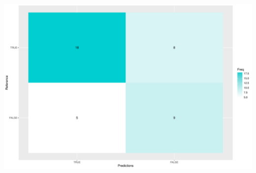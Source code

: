 \documentclass[
]{article}
\begin{document}
\includegraphics{8.Random_Forest_lab_gene_files/figure-latex/unnamed-chunk-23-1.pdf}
\end{document}
